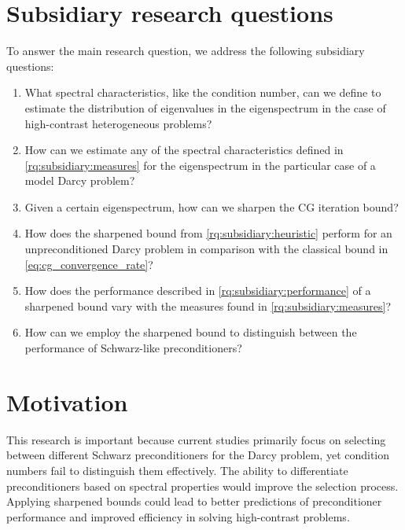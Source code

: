 \section{Subsidiary research questions}
\begin{subsidiaryq} \label{rq:subsidiaries}
    To answer the main research question, we address the following subsidiary questions:
    \setlength\itemindent{1in}
    \begin{enumerate}[label=\textbf{Q\arabic*}, ref=\textbf{Q\arabic*}, leftmargin=1cm]
        \item\label{rq:subsidiary:measures} What spectral characteristics, like the condition number, can we define to estimate the distribution of eigenvalues in the eigenspectrum in the case of high-contrast heterogeneous problems?
        \item\label{rq:subsidiary:estimation} How can we estimate any of the spectral characteristics defined in \ref{rq:subsidiary:measures} for the eigenspectrum in the particular case of a model Darcy problem?
        \item\label{rq:subsidiary:heuristic} Given a certain eigenspectrum, how can we sharpen the CG iteration bound?
        \item\label{rq:subsidiary:performance} How does the sharpened bound from \ref{rq:subsidiary:heuristic} perform for an unpreconditioned Darcy problem in comparison with the classical bound in \cref{eq:cg_convergence_rate}?
        \item\label{rq:subsidiary:dependance} How does the performance described in \ref{rq:subsidiary:performance} of a sharpened bound vary with the measures found in \ref{rq:subsidiary:measures}?
        \item\label{rq:subsidiary:preconditioners} How can we employ the sharpened bound to distinguish between the performance of Schwarz-like preconditioners? 
    \end{enumerate}
\end{subsidiaryq}

\section{Motivation}
This research is important because current studies primarily focus on selecting between different Schwarz preconditioners for the Darcy problem, yet condition numbers fail to distinguish them effectively. The ability to differentiate preconditioners based on spectral properties would improve the selection process. Applying sharpened bounds could lead to better predictions of preconditioner performance and improved efficiency in solving high-contrast problems.

